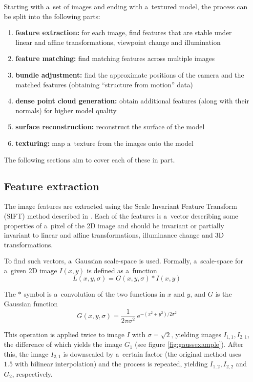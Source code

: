 Starting with a~set of images and ending with a~textured model, the process can be split into the following parts:

\begin{enumerate}
	\item \textbf{feature extraction:} for each image, find features that are stable under linear and affine transformations, viewpoint change and illumination
	\item \textbf{feature matching:} find matching features across multiple images
	\item \textbf{bundle adjustment:} find the approximate positions of the camera and the matched features (obtaining ``structure from motion'' data)
	\item \textbf{dense point cloud generation:} obtain additional features (along with their normals) for higher model quality
	\item \textbf{surface reconstruction:} reconstruct the surface of the model
	\item \textbf{texturing:} map a~texture from the images onto the model
\end{enumerate}

The following sections aim to cover each of these in part.

\subsection{Feature extraction} \label{ch:fext}
The image features are extracted using the Scale Invariant Feature Transform (SIFT) method described in \citet{lowe1999object,lowe2004distinctive}.
Each of the features is a~vector describing some properties of a~pixel of the 2D image and should be invariant or partially invariant to linear and affine transformations, illuminance change and 3D transformations.

To find such vectors, a~Gaussian scale-space is used.
Formally, a~scale-space for a~given 2D image $I(x, y)$ is defined as a~function
\begin{equation} L(x, y, \sigma) = G(x, y, \sigma) * I(x, y) \end{equation}

The $*$ symbol is a~convolution of the two functions in $x$ and $y$, and $G$ is the Gaussian function
\begin{equation}G(x, y, \sigma) = \frac{1}{2\pi \sigma^2}\ \mathrm{e}^{-(x^2 + y^2) / 2\sigma^2}\end{equation}

This operation is applied twice to image $I$ with $\sigma = \sqrt{2}$, yielding images $I_{1,1}, I_{2,1}$, the difference of which yields the image $G_1$ (see figure \ref{fig:gaussexample}).
After this, the image $I_{2,1}$ is downscaled by a~certain factor (the original method uses $1.5$ with bilinear interpolation) and the process is repeated, yielding $I_{1,2}, I_{2,2}$ and $G_2$, respectively.

